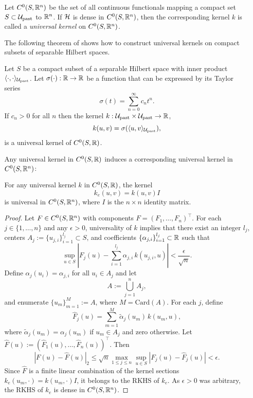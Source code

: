 \begin{definition}
Let $C^0(S,\mathbb{R}^{n})$ be the set of all continuous functionals mapping a compact set $S\subset{\cal U}_\text{past}$ to $\mathbb{R}^n$. If ${\cal H}$ is dense in $C^0(S,\mathbb{R}^{n})$, then the corresponding kernel $k$ is called a \emph{universal kernel} on $C^0(S,\mathbb{R}^{n})$.
\end{definition}

The following theorem of \textcite{christmann_universal_2010} shows how to construct universal kernels on compact subsets of separable Hilbert spaces.
\begin{theorem}
Let $S$ be a compact subset of a separable Hilbert space with inner product $\langle\cdot,\cdot\rangle_{{\cal U}_\text{past}}$. Let $\sigma(\cdot):\mathbb{R}\to\mathbb{R}$ be a function that can be expressed by its Taylor series
$$
\sigma(t)=\sum_{n=0}^{\infty}c_nt^n.
$$
If $c_n>0$ for all $n$ then the kernel $k:{\cal U}_\text{past}\times {\cal U}_\text{past}\to \mathbb{R}$,
$$
k(u,v)=\sigma(\langle u,v\rangle_{{\cal U}_\text{past}}),
$$
is a universal kernel of $C^0(S,\mathbb{R})$.
\end{theorem}

Any universal kernel in $C^0(S,\mathbb{R})$ induces a corresponding universal kernel in $C^0(S,\mathbb{R}^n)$:
\begin{theorem}
For any universal kernel $k$ in $C^0(S,\mathbb{R})$, the kernel
$$
k_e(u,v)=k(u,v)I
$$
is universal in $C^0(S,\mathbb{R}^n)$, where $I$ is the $n\times n$ identity matrix.
\end{theorem}

\begin{proof}
Let \(F\in C^0(S,\mathbb{R}^n)\) with components \(F=(F_1,\dots,F_n)^\top\). For each \(j\in\{1,\dots,n\}\) and any \(\epsilon>0\), universality of \(k\) implies that there exist an integer \(l_j\), centers \(A_j:=\{u_{j,i}\}_{i=1}^{l_j}\subset S\), and coefficients \(\{\alpha_{j,i}\}_{i=1}^{l_j}\subset\mathbb{R}\) such that
\[
\sup_{u\in S} \left|F_j(u)-\sum_{i=1}^{l_j}\alpha_{j,i}\, k(u_{j,i},u)\right| < \frac{\epsilon}{\sqrt{n}}.
\]
Define $\alpha_{j}(u_i)=\alpha_{j,i}$ for all $u_i \in A_j$ and let
\[
A:=\bigcup_{j=1}^n A_j,
\]
and enumerate \(\{u_{m}\}_{m=1}^{M}:=A\), where $M=\text{Card}(A)$. For each \(j\), define
\[
\hat{F}_j(u)=\sum_{m=1}^{M}\tilde{\alpha}_{j}(u_m)\, k(u_{m},u),
\]
where \(\tilde{\alpha}_{j}(u_m)=\alpha_{j}(u_m)\) if \(u_{m}\in A_j\) and zero otherwise. Let \(\hat{F}(u):=(\hat{F}_1(u),\dots,\hat{F}_n(u))^\top\). Then
\[
|F(u)-\hat{F}(u)|_2 \le \sqrt{n}\max_{1\le j\le n}\sup_{u\in S}|F_j(u)-\hat{F}_j(u)| < \epsilon.
\]
Since \(\hat{F}\) is a finite linear combination of the kernel sections \(k_e(u_m,\cdot)=k(u_m,\cdot)I\), it belongs to the RKHS of \(k_e\). As \(\epsilon>0\) was arbitrary, the RKHS of \(k_e\) is dense in \(C^0(S,\mathbb{R}^n)\).
\end{proof}

